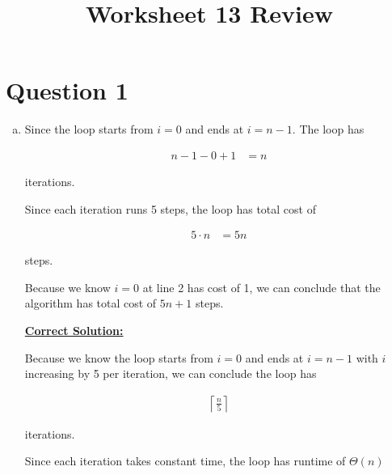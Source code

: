 \documentclass[12pt]{article}
\begin{document}
\title{Worksheet 13 Review}
\maketitle

\section*{Question 1}
\begin{enumerate}[a.]
    \item

    Since the loop starts from $i = 0$ and ends at $i = n - 1$. The loop has

    \begin{align}
        n - 1 - 0 + 1 &= n
    \end{align}

    iterations.

    \bigskip

    Since each iteration runs 5 steps, the loop has total cost of

    \begin{align}
        5 \cdot n &= 5n
    \end{align}

    steps.

    \bigskip

    Because we know $i = 0$ at line 2 has cost of 1, we can conclude that the
    algorithm has total cost of $5n + 1$ steps.

    \bigskip

    \begin{mdframed}
        \underline{\textbf{Correct Solution:}}

        \bigskip

        \color{red}
        Because we know the loop starts from $i = 0$ and ends at
        $i = n - 1$ with $i$ increasing by 5 per iteration, we can conclude the
        loop has

        \begin{align}
            \left\lceil \frac{n}{5} \right\rceil
        \end{align}

        \color{black}

        iterations.

        \bigskip

        \color{red}
        Since each iteration takes constant time, the loop has
        runtime of $\Theta(n)$
        \color{black}


\end{mdframed}
\end{enumerate}
\end{document}
